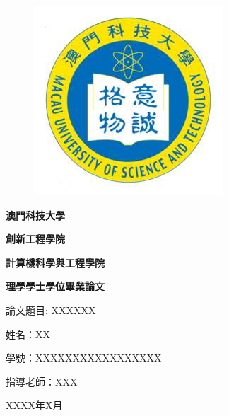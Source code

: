 \documentclass[12pt]{article}
\begin{document}
\begin{CJK*}{UTF8}{bsmi}
\thispagestyle{empty}
\begin{CJK*}{UTF8}{bsmi}
\begin{figure}
\centering
\includegraphics[scale=0.6]{must.jpg}

\end{figure}


\begin{center}
\Huge
\textbf {澳門科技大學}
\end{center}
\par


\begin{center}
\linespread{2}

\normalsize \textbf {創新工程學院}
\par

\normalsize \textbf {計算機科學與工程學院}
\par

\normalsize \textbf {理學學士學位畢業論文}
\par


\normalsize 論文題目: XXXXXX
\par





\normalsize 姓名：XX
\par
\normalsize 學號：XXXXXXXXXXXXXXXXX
\par
\normalsize 指導老師：XXX
\par
\normalsize XXXX年X月




\par
\end{center}
\end{CJK*}


\newpage




\linespread{1.5}
\large



\end{CJK*}
\end{document}
